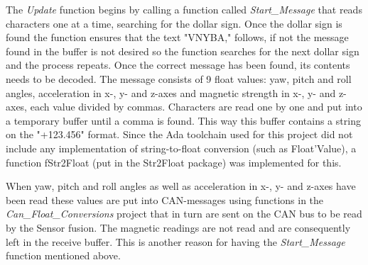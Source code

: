 The \emph{Update} function begins by calling a function called \newline
\emph{Start\_Message} that reads characters one at a time, searching for the dollar sign. Once the dollar sign is found the function ensures that the text "VNYBA," follows, if not the message found in the buffer is not desired so the function searches for the next dollar sign and the process repeats. \newline
Once the correct message has been found, its contents needs to be decoded. The message consists of 9 float values: yaw, pitch and roll angles, acceleration in x-, y- and z-axes and magnetic strength in x-, y- and z-axes, each value divided by commas. \newline
Characters are read one by one and put into a temporary buffer until a comma is found. This way this buffer contains a string on the "+123.456" format. Since the Ada toolchain used for this project did not include any implementation of string-to-float conversion (such as Float'Value), a function fStr2Float (put in the Str2Float package) was implemented for this.

When yaw, pitch and roll angles as well as acceleration in x-, y- and z-axes have been read these values are put into CAN-messages using functions in the \emph{Can\_Float\_Conversions} project that in turn are sent on the CAN bus to be read by the Sensor fusion. \newline
The magnetic readings are not read and are consequently left in the receive buffer. This is another reason for having the \emph{Start\_Message} function mentioned above.

